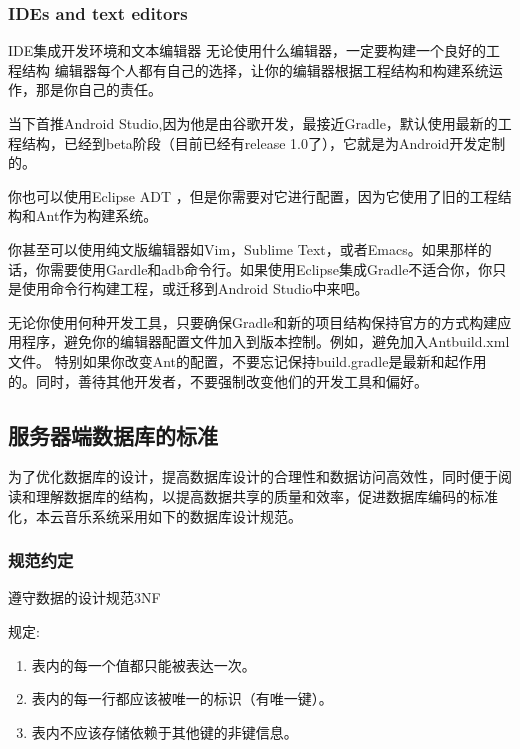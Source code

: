 \subsubsection{IDEs and text editors}
IDE集成开发环境和文本编辑器
无论使用什么编辑器，一定要构建一个良好的工程结构 编辑器每个人都有自己的选择，让你的编辑器根据工程结构和构建系统运作，那是你自己的责任。

当下首推Android Studio,因为他是由谷歌开发，最接近Gradle，默认使用最新的工程结构，已经到beta阶段（目前已经有release 1.0了），它就是为Android开发定制的。

你也可以使用Eclipse ADT ，但是你需要对它进行配置，因为它使用了旧的工程结构和Ant作为构建系统。

你甚至可以使用纯文版编辑器如Vim，Sublime Text，或者Emacs。如果那样的话，你需要使用Gardle和adb命令行。如果使用Eclipse集成Gradle不适合你，你只是使用命令行构建工程，或迁移到Android Studio中来吧。

无论你使用何种开发工具，只要确保Gradle和新的项目结构保持官方的方式构建应用程序，避免你的编辑器配置文件加入到版本控制。例如，避免加入Antbuild.xml文件。
特别如果你改变Ant的配置，不要忘记保持build.gradle是最新和起作用的。同时，善待其他开发者，不要强制改变他们的开发工具和偏好。



\subsection{服务器端数据库的标准}
为了优化数据库的设计，提高数据库设计的合理性和数据访问高效性，同时便于阅读和理解数据库的结构，以提高数据共享的质量和效率，促进数据库编码的标准化，本云音乐系统采用如下的数据库设计规范。

\subsubsection{规范约定}
遵守数据的设计规范3NF 

规定:
\begin{enumerate}
	\item 表内的每一个值都只能被表达一次。
	\item 表内的每一行都应该被唯一的标识（有唯一键）。
	\item 表内不应该存储依赖于其他键的非键信息。
\end{enumerate} 

